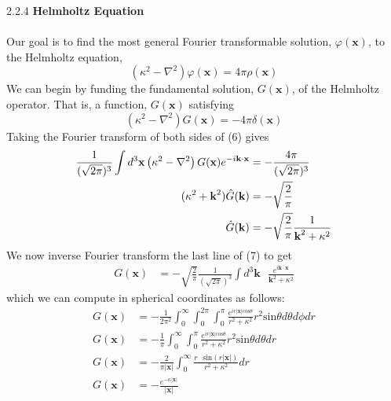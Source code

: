 \documentclass[]{book}
\begin{document}
{2.2.4 \hspace{0.5cm} \textbf{Helmholtz Equation}} \\
\vspace{0.1 cm} \\
Our goal is to find the most general Fourier transformable solution, $\varphi(\textbf{x})$, to the Helmholtz equation,
\begin{equation}
\left(\kappa^2-\nabla^2\right)\varphi(\textbf{x})=4\pi\rho(\textbf{x})
\end{equation}
We can begin by funding the fundamental solution, $G(\textbf{x})$, of the Helmholtz operator. That is, a function, $G(\textbf{x})$ satisfying
\begin{equation}
\left(\kappa^2-\nabla^2\right)G(\textbf{x})=-4\pi\delta(\textbf{x})
\end{equation}
Taking the Fourier transform of both sides of (6) gives
\begin{equation}
\begin{split}
\frac{1}{(\sqrt{2\pi})^3}\int d^3\textbf{x}\left(\kappa^2-\nabla^2\right)G(\textbf{x}) e^{-i \textbf{k}\cdot\textbf{x}} &=-\frac{4\pi}{(\sqrt{2\pi})^3} \\
(\kappa^2+ \textbf{k}^2)\hat{G}(\textbf{\textbf{k}}) &= -\sqrt{\frac{2}{\pi}} \\
\hat{G}(\textbf{\textbf{k}}) &= -\sqrt{\frac{2}{\pi}} \frac{1}{\textbf{k}^2+ \kappa^2}
\end{split}
\end{equation}
We now inverse Fourier transform the last line of (7) to get
\begin{equation}
\begin{split}
G(\textbf{x}) &= -\sqrt{\frac{2}{\pi}} \frac{1}{(\sqrt{2\pi})^3} \int d^3\textbf{k}\text{ } \frac{e^{i \textbf{k}\cdot\textbf{x}}}{\textbf{k}^2+ \kappa^2}
\end{split}
\end{equation}
which we can compute in spherical coordinates as follows:
\begin{equation}
\begin{split}
G(\textbf{x}) &= -\frac{1}{2\pi^2} \int_{0}^{\infty}\int_{0}^{2\pi}\int_{0}^{\pi} \frac{e^{ir|\textbf{x}|\text{cos}\theta}}{r^2+ \kappa^2}  r^2 \text{sin}\theta d\theta d\phi dr\\
G(\textbf{x}) &= -\frac{1}{\pi} \int_{0}^{\infty}\int_{0}^{\pi} \frac{e^{ir|\textbf{x}|\text{cos}\theta}}{r^2+ \kappa^2}  r^2 \text{sin}\theta d\theta dr \\
G(\textbf{x}) &= -\frac{2}{\pi |\textbf{x}|}\int_{0}^{\infty} \frac{r\text{ }\text{sin}(r|\textbf{x}|)}{r^2+ \kappa^2} dr \\
G(\textbf{x}) &= -\frac{e^{-\kappa|\textbf{x}|}}{|\textbf{x}|} \\
\end{split}
\end{equation}
\end{document}
